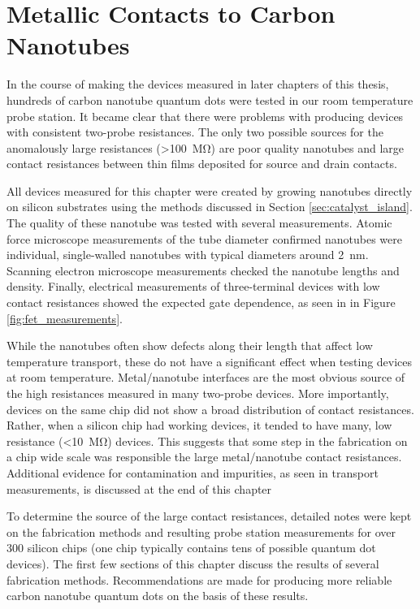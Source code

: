 \chapter{Metallic Contacts to Carbon Nanotubes}
\label{chap:contacts}

In the course of making the devices measured in later chapters of this thesis, hundreds of carbon nanotube quantum dots were tested in our room temperature probe station. It became clear that there were problems with producing devices with consistent two-probe resistances. The only two possible sources for the anomalously large resistances (>\SI{100}{\mega\ohm}) are poor quality nanotubes and large contact resistances between thin films deposited for source and drain contacts. 

All devices measured for this chapter were created by growing nanotubes directly on silicon substrates using the methods discussed in Section \ref{sec:catalyst_island}. The quality of these nanotube was tested with several measurements. Atomic force microscope measurements of the tube diameter confirmed nanotubes were individual, single-walled nanotubes with typical diameters around \SI{2}{\nano\meter}. Scanning electron microscope measurements checked the nanotube lengths and density. Finally, electrical measurements of three-terminal devices with low contact resistances showed the expected gate dependence, as seen in in Figure \ref{fig:fet_measurements}.

While the nanotubes often show defects along their length that affect low temperature transport, these do not have a significant effect when testing devices at room temperature.  Metal/nanotube interfaces are the most obvious source of the high resistances measured in many two-probe devices. More importantly, devices on the same chip did not show a broad distribution of contact resistances. Rather, when a silicon chip had working devices, it tended to have many, low resistance (<\SI{10}{\mega\ohm}) devices. This suggests that some step in the fabrication on a chip wide scale was responsible the large metal/nanotube contact resistances. Additional evidence for contamination and impurities, as seen in transport measurements, is discussed at the end of this chapter

To determine the source of the large contact resistances, detailed notes were kept on the fabrication methods and resulting probe station measurements for over 300 silicon chips (one chip typically contains tens of possible quantum dot devices). The first few sections of this chapter discuss the results of several fabrication methods. Recommendations are made for producing more reliable carbon nanotube quantum dots on the basis of these results.

